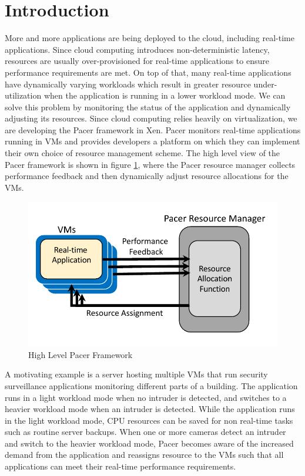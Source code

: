 \section{Introduction}



More and more applications are being deployed to the cloud, including real-time applications. Since cloud computing introduces non-deterministic latency\cite{rtcloud}, resources are usually over-provisioned for real-time applications to ensure performance requirements are met. On top of that, many real-time applications have dynamically varying workloads which result in greater resource under-utilization when the application is running in a lower workload mode. We can solve this problem by monitoring the status of the application and dynamically adjusting its resources. Since cloud computing relies heavily on virtualization, we are developing the Pacer framework in Xen. Pacer monitors real-time applications running in VMs and provides developers a platform on which they can implement their own choice of resource management scheme. The high level view of the Pacer framework is shown in figure \ref{anchors}, where the Pacer resource manager collects performance feedback and then dynamically adjust resource allocations for the VMs.
\begin{figure}[h!]
\centering
\includegraphics[width=1\linewidth]{images/anchors}
\caption{High Level Pacer Framework}
\label{anchors}
\end{figure}

A motivating example is a server hosting multiple VMs that run security surveillance applications monitoring different parts of a building. The application runs in a light workload mode when no intruder is detected, and switches to a heavier workload mode when an intruder is detected. While the application runs in the light workload mode, CPU resources can be saved for non real-time tasks such as routine server backups. When one or more cameras detect an intruder and switch to the heavier workload mode, Pacer becomes aware of the increased demand from the application and reassigns resource to the VMs such that all applications can meet their real-time performance requirements.

